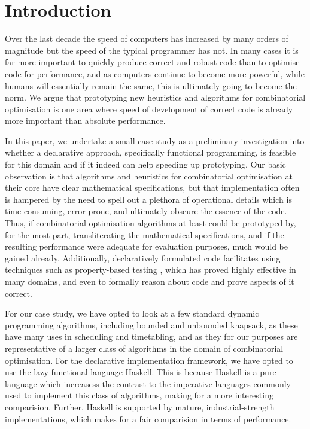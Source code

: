 \section{Introduction}

Over the last decade the speed of computers has increased by many orders of
magnitude but the speed of the typical programmer has not. In many cases it is
far more important to quickly produce correct and robust code than to optimise
code for performance, and as computers continue to become more powerful, while
humans will essentially remain the same, this is ultimately going to become
the norm. We argue that prototyping new heuristics and algorithms for
combinatorial optimisation is one area where speed of development of correct
code is already more important than absolute performance.

In this paper, we undertake a small case study as a preliminary investigation
into whether a declarative approach, specifically functional programming, is
feasible for this domain and if it indeed can help speeding up prototyping.
Our basic observation is that algorithms and heuristics for combinatorial
optimisation at their core have clear mathematical specifications, but that
implementation often is hampered by the need to spell out a plethora of
operational details which is time-consuming, error prone, and ultimately
obscure the essence of the code. Thus, if combinatorial optimisation
algorithms at least could be prototyped by, for the most part, transliterating
the mathematical specifications, and if the resulting performance were
adequate for evaluation purposes, much would be gained already. Additionally,
declaratively formulated code facilitates using techniques such as
property-based testing \cite{quickcheck}, which has proved highly effective
in many domains, and even to formally reason about code and prove aspects
of it correct.

For our case study, we have opted to look at a few standard dynamic
programming algorithms, including bounded and unbounded knapsack, as these
have many uses in scheduling and timetabling, and as they for our purposes are
representative of a larger class of algorithms in the domain of combinatorial
optimisation. For the declarative implementation framework, we have opted to
use the lazy functional language Haskell. This is because Haskell is a pure
language which increasess the contrast to the imperative languages commonly
used to implement this class of algorithms, making for a more interesting
comparision. Further, Haskell is supported by mature, industrial-strength
implementations, which makes for a fair comparision in terms of performance.


